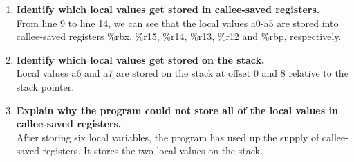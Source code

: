\documentclass{article}
\begin{document}
\begin{enumerate}[label=\textbf{\Alph*.}]
	\item \textbf{Identify which local values get stored in callee-saved registers.} \\
	From line 9 to line 14, we can see that the local values a0-a5 are stored into
	callee-saved registers \%rbx, \%r15, \%r14, \%r13, \%r12 and \%rbp, respectively.
	\item \textbf{Identify which local values get stored on the stack.} \\
	Local values a6 and a7 are stored on the stack at offset 0 and 8 relative to the
	stack pointer.
	\item \textbf{Explain why the program could not store all of the local values in callee-saved
	registers.} \\
	After storing six local variables, the program has used up the supply of callee-saved
	registers. It stores the two local values on the stack.
\end{enumerate}
\end{document}
